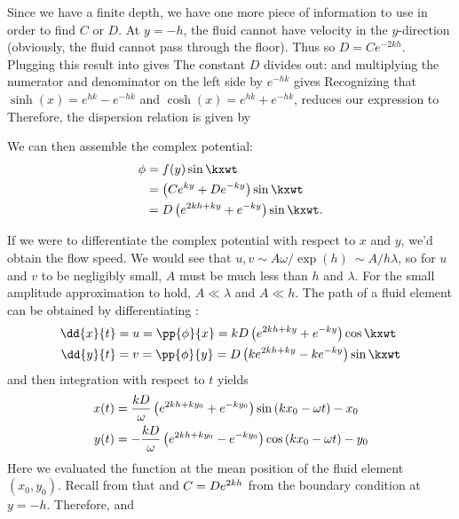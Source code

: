 \documentclass[12pt]{book}
\begin{document}
{Since we have a finite depth, we have one more piece of information to use in order to find $C$ or $D$.  At $y=-h$, the fluid cannot have velocity in the $y$-direction (obviously, the fluid cannot pass through the floor). Thus
 so 
$D = Ce^{-2kh}$.  Plugging this result into  gives
The constant $D$ divides out:
and multiplying the numerator and denominator on the left side by $e^{-hk}$ gives
Recognizing that $\sinh(x) = e^{hk} - e^{-hk}$ and $\cosh(x) = e^{hk} + e^{-hk}$, reduces our expression to
Therefore, the dispersion relation is given by

We can then assemble the complex potential:
\begin{align}
\phi &= f(y)\sin\kxwt \notag \\
&= \left(C\e{ky}+D\e{-ky}\right)\sin\kxwt \notag\\
&=D\left(\e{2kh +ky} + \e{-ky}\right)\sin\kxwt.\label{23986582376419234612341293847512989384567} 
\end{align}

If we were to differentiate the complex potential with respect to $x$ and $y$, we'd obtain the flow speed.  We would see that $u,v \sim A\omega / \exp(h) ~ \sim A/h\lambda$, so for $u$ and $v$ to be negligibly small, $A$ must be much less than $h$ and $\lambda$.  For the small amplitude approximation to hold, $A\ll\lambda$ and $A\ll h$.  The path of a fluid element can be obtained by differentiating :
\begin{align}
\dd{x}{t} &= u = \pp{\phi}{x} = kD\left(\e{2kh+ky} + \e{-ky}\right)\cos\kxwt \\
\dd{y}{t}&= v  = \pp{\phi}{y} = D\left(k\e{2kh+ky} - k\e{-ky}\right)\sin\kxwt
\end{align}
and then integration with respect to $t$ yields
\begin{align}
x(t) &= \frac{kD}{\omega}\left(e^{2kh+ky_0} + e^{-ky_0}\right)\sin\left(kx_0-\omega t\right) - x_0 \label{28973654129865}\\ 
y(t) &= -\frac{kD}{\omega}\left(e^{2kh+ky_0} - e^{-ky_0}\right)\cos\left(kx_0-\omega t\right) - y_0 \label{30952734095273}
\end{align}
Here we evaluated the function at the mean position of the fluid element $(x_0,y_0)$.  Recall from  that
and $C = De^{2kh}$ from the boundary condition at $y=-h$.  Therefore,
and

}
\end{document}
